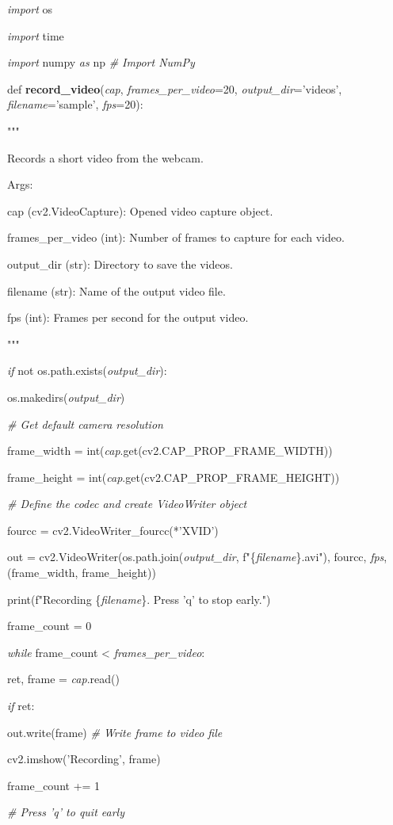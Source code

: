 \documentclass[
]{article}
\begin{document}
\emph{import} os

\emph{import} time

\emph{import} numpy \emph{as} np \emph{\# Import NumPy}

def \textbf{record\_video}(\emph{cap}, \emph{frames\_per\_video}=20, \emph{output\_dir}='videos', \emph{filename}='sample', \emph{fps}=20):

"""

Records a short video from the webcam.

Args:

cap (cv2.VideoCapture): Opened video capture object.

frames\_per\_video (int): Number of frames to capture for each video.

output\_dir (str): Directory to save the videos.

filename (str): Name of the output video file.

fps (int): Frames per second for the output video.

"""

\emph{if} not os.path.exists(\emph{output\_dir}):

os.makedirs(\emph{output\_dir})

\emph{\# Get default camera resolution}

frame\_width = int(\emph{cap}.get(cv2.CAP\_PROP\_FRAME\_WIDTH))

frame\_height = int(\emph{cap}.get(cv2.CAP\_PROP\_FRAME\_HEIGHT))

\emph{\# Define the codec and create VideoWriter object}

fourcc = cv2.VideoWriter\_fourcc(*'XVID')

out = cv2.VideoWriter(os.path.join(\emph{output\_dir}, f"\{\emph{filename}\}.avi"), fourcc, \emph{fps}, (frame\_width, frame\_height))

print(f"Recording \{\emph{filename}\}. Press 'q' to stop early.")

frame\_count = 0

\emph{while} frame\_count \textless{} \emph{frames\_per\_video}:

ret, frame = \emph{cap}.read()

\emph{if} ret:

out.write(frame) \emph{\# Write frame to video file}

cv2.imshow('Recording', frame)

frame\_count += 1

\emph{\# Press 'q' to quit early}
\end{document}
